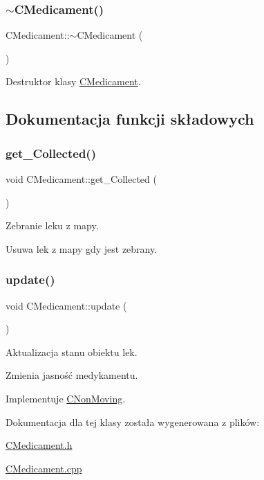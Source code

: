 \subsubsection{\texorpdfstring{$\sim$\+C\+Medicament()}{~CMedicament()}}
{\footnotesize\ttfamily C\+Medicament\+::$\sim$\+C\+Medicament (\begin{DoxyParamCaption}{ }\end{DoxyParamCaption})}



Destruktor klasy \mbox{\hyperlink{class_c_medicament}{C\+Medicament}}. 



\subsection{Dokumentacja funkcji składowych}
\mbox{\label{class_c_medicament_a6db7f174a35b1d89c86cd415b0bf1708}} 
\subsubsection{\texorpdfstring{get\+\_\+\+Collected()}{get\_Collected()}}
{\footnotesize\ttfamily void C\+Medicament\+::get\+\_\+\+Collected (\begin{DoxyParamCaption}{ }\end{DoxyParamCaption})}



Zebranie leku z mapy. 

Usuwa lek z mapy gdy jest zebrany. \mbox{\label{class_c_medicament_a3568bc88e5fa9db63e82fcad13ce90eb}} 
\subsubsection{\texorpdfstring{update()}{update()}}
{\footnotesize\ttfamily void C\+Medicament\+::update (\begin{DoxyParamCaption}{ }\end{DoxyParamCaption})\hspace{0.3cm}{\ttfamily [virtual]}}



Aktualizacja stanu obiektu lek. 

Zmienia jasność medykamentu. 

Implementuje \mbox{\hyperlink{class_c_non_moving_ad17a839c59eb2639623e863a3d6c8740}{C\+Non\+Moving}}.



Dokumentacja dla tej klasy została wygenerowana z plików\+:\begin{DoxyCompactItemize}
\item 
\mbox{\hyperlink{_c_medicament_8h}{C\+Medicament.\+h}}\item 
\mbox{\hyperlink{_c_medicament_8cpp}{C\+Medicament.\+cpp}}\end{DoxyCompactItemize}
